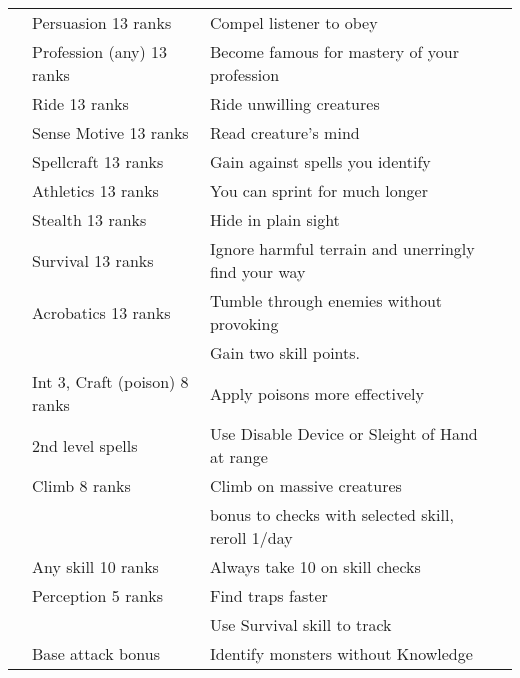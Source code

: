 {\begin{longtabu}{>{\lcol}p{10em} >{\lcol}p{15em} >{\lcol}X >{\lcol}p{3em}}
     & Persuasion 13 ranks & Compel listener to obey &  \\
     & Profession (any) 13 ranks & Become famous for mastery of your profession &  \\
     & Ride 13 ranks & Ride unwilling creatures &  \\
     & Sense Motive 13 ranks & Read creature's mind &  \\
     & Spellcraft 13 ranks & Gain  against spells you identify &  \\
     & Athletics 13 ranks & You can sprint for much longer &  \\
     & Stealth 13 ranks & Hide in plain sight &  \\
     & Survival 13 ranks & Ignore harmful terrain and unerringly find your way &  \\
     & Acrobatics 13 ranks & Tumble through enemies without provoking &  \\
     & \x & Gain two skill points. &  \\
     & Int 3, Craft (poison) 8 ranks & Apply poisons more effectively &  \\
     &  2nd level spells & Use Disable Device or Sleight of Hand at range &  \\
     & Climb 8 ranks & Climb on massive creatures &  \\
     & \x &   bonus to checks with selected skill, reroll 1/day &  \\
     & Any skill 10 ranks & Always take 10 on skill checks &  \\
     & Perception 5 ranks & Find traps faster &  \\
     & \x &  Use Survival skill to track &  \\
     & Base attack bonus  & Identify monsters without Knowledge &  \\


\end{longtabu}}
